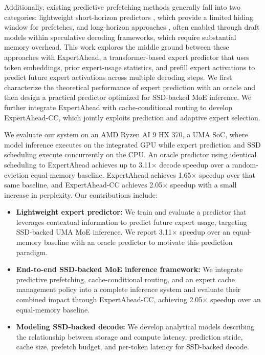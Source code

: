 Additionally, existing predictive prefetching methods generally fall into two categories: lightweight short-horizon predictors \cite{zhu2025preattentionexpertpredictionprefetching, eliseev2023fastinferencemixtureofexpertslanguage, zhu2026daliworkloadawareoffloadingframework, fang2025fatefastedgeinference, yao2024exploitinginterlayerexpertaffinity, song2025promoefastmoebasedllm, zhang2026duoservemoedualphaseexpertprefetch, yi2025edgemoeempoweringsparselarge, gavhane2025moebeyondlearningbasedexpertactivation,xue2025moeinfinityefficientmoeinference}, which provide a limited hiding window for prefetches, and long-horizon approaches \cite{wang2025moespeqspeculativequantizeddecoding, chen2025spmoespeculativedecodingprefetching}, often enabled through draft models within speculative decoding frameworks, which require substantial memory overhead. This work explores the middle ground between these approaches with ExpertAhead, a transformer-based expert predictor that uses token embeddings, prior expert-usage statistics, and prefill expert activations to predict future expert activations across multiple decoding steps. We first characterize the theoretical performance of expert prediction with an oracle and then design a practical predictor optimized for SSD-backed MoE inference. We further integrate ExpertAhead with cache-conditional routing to develop ExpertAhead-CC, which jointly exploits prediction and adaptive expert selection.

We evaluate our system on an AMD Ryzen AI 9 HX 370, a UMA SoC, where model inference executes on the integrated GPU while expert prediction and SSD scheduling execute concurrently on the CPU. An oracle predictor using identical scheduling to ExpertAhead achieves up to 3.11$\times$ decode speedup over a random-eviction equal-memory baseline. ExpertAhead achieves 1.65$\times$ speedup over that same baseline, and ExpertAhead-CC achieves 2.05$\times$ speedup with a small increase in perplexity.  Our contributions include:
\begin{itemize}[leftmargin=1.5em] 
    \item \textbf{Lightweight expert predictor:} We train and evaluate a predictor that leverages contextual information to predict future expert usage, targeting SSD-backed UMA MoE inference. We report  3.11$\times$ speedup over an equal-memory baseline with an oracle predictor to motivate this prediction paradigm.
    
    \item \textbf{End-to-end SSD-backed MoE inference framework:} We integrate predictive prefetching, cache-conditional routing, and an expert cache management policy into a complete inference system and evaluate their combined impact through ExpertAhead-CC, achieving 2.05$\times$ speedup over an equal-memory baseline. 
    
    \item \textbf{Modeling SSD-backed decode:} We develop analytical models describing the relationship between storage and compute latency, prediction stride, cache size, prefetch budget, and per-token latency for SSD-backed decode. 
\end{itemize}
